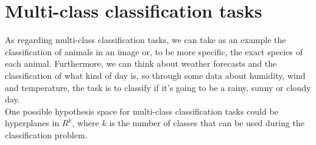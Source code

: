 \section{Multi-class classification tasks}

As regarding multi-class classification tasks, we can take as an example the classification of animals in an image or, to be more specific, the exact species of each animal. Furthermore, we can think about weather forecasts and the classification of what kind of day is, so through some data about humidity, wind and temperature, the task is to classify if it’s going to be a rainy, sunny or cloudy day. \\

One possible hypothesis space for multi-class classification tasks could be hyperplanes in $R^k$, where $k$ is the number of classes that can be used during the classification problem.
